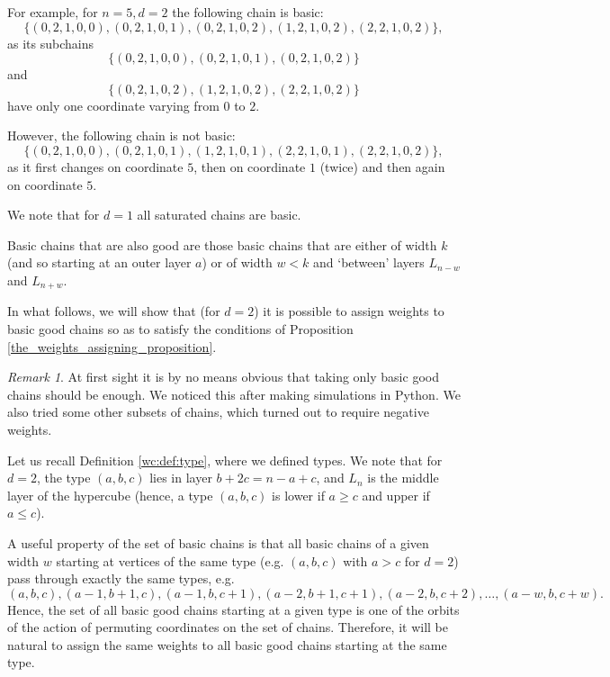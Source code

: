 \documentclass[11pt, reqno]{amsart}
\theoremstyle{remark}
\newtheorem*{remark}{Remark}
\numberwithin{equation}{section}
\begin{document}
For example, for $n=5, d=2$ the following chain is basic:
\begin{equation*}
    \{(0, 2, 1, 0, 0), (0, 2, 1, 0, 1), (0, 2, 1, 0, 2), (1, 2, 1, 0, 2), (2, 2, 1, 0, 2)\},
\end{equation*}
as its subchains
\begin{equation*}
    \{(0, 2, 1, 0, 0), (0, 2, 1, 0, 1), (0, 2, 1, 0, 2)\}
\end{equation*}
and
\begin{equation*}
    \{(0, 2, 1, 0, 2), (1, 2, 1, 0, 2), (2, 2, 1, 0, 2)\}
\end{equation*}
have only one coordinate varying from $0$ to $2$.

However, the following chain is not basic:
\begin{equation*}
    \{(0, 2, 1, 0, 0), (0, 2, 1, 0, 1), (1, 2, 1, 0, 1), (2, 2, 1, 0, 1), (2, 2, 1, 0, 2) \},
\end{equation*}
as it first changes on coordinate $5$, then on coordinate $1$ (twice) and then again on coordinate $5$.

We note that for $d=1$ all saturated chains are basic.

Basic chains that are also good are those basic chains that are either of width $k$ (and so starting at an outer layer $a$) or of width $w<k$ and `between' layers $L_{n-w}$ and $L_{n+w}$.

In what follows, we will show that (for $d=2$) it is possible to assign weights to basic good chains so as to satisfy the conditions of Proposition \ref{the_weights_assigning_proposition}.

\begin{remark}
    At first sight it is by no means obvious that taking only basic good chains should be enough. We noticed this after making simulations in Python. We also tried some other subsets of chains, which turned out to require negative weights.
\end{remark}

Let us recall Definition \ref{wc:def:type}, where we defined types. We note that for $d=2$, the type $(a, b, c)$ lies in layer $b+2c=n-a+c$, and $L_n$ is the middle layer of the hypercube (hence, a type $(a, b, c)$ is lower if $a \geqslant c$ and upper if $a \leqslant c$).

A useful property of the set of basic chains is that all basic chains of a given width $w$ starting at vertices of the same type (e.g. $(a, b, c)$ with $a>c$ for $d=2$) pass through exactly the same types, e.g.
\begin{equation*}
    (a, b, c), (a-1, b+1, c), (a-1, b, c+1), (a-2, b+1, c+1), (a-2, b, c+2), \ldots, (a-w, b, c+w).
\end{equation*}
Hence, the set of all basic good chains starting at a given type is one of the orbits of the action of permuting coordinates on the set of chains. Therefore, it will be natural to assign the same weights to all basic good chains starting at the same type.
\end{document}
